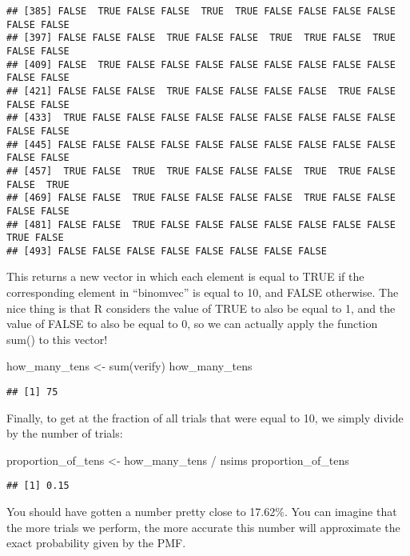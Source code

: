 \documentclass[
]{book}
\newenvironment{Shaded}{\begin{snugshade}}{\end{snugshade}}
\newcommand{\FunctionTok}[1]{\textcolor[rgb]{0.00,0.00,0.00}{#1}}
\newcommand{\NormalTok}[1]{#1}
\newcommand{\OtherTok}[1]{\textcolor[rgb]{0.56,0.35,0.01}{#1}}
\newcommand{\SpecialCharTok}[1]{\textcolor[rgb]{0.00,0.00,0.00}{#1}}
\begin{document}
\begin{verbatim}
## [385] FALSE  TRUE FALSE FALSE  TRUE  TRUE FALSE FALSE FALSE FALSE FALSE FALSE
## [397] FALSE FALSE FALSE  TRUE FALSE FALSE  TRUE  TRUE FALSE  TRUE FALSE FALSE
## [409] FALSE  TRUE FALSE FALSE FALSE FALSE FALSE FALSE FALSE FALSE FALSE FALSE
## [421] FALSE FALSE FALSE  TRUE FALSE FALSE FALSE FALSE  TRUE FALSE FALSE FALSE
## [433]  TRUE FALSE FALSE FALSE FALSE FALSE FALSE FALSE FALSE FALSE FALSE FALSE
## [445] FALSE FALSE FALSE FALSE FALSE FALSE FALSE FALSE FALSE FALSE FALSE FALSE
## [457]  TRUE FALSE  TRUE  TRUE FALSE FALSE FALSE  TRUE  TRUE FALSE FALSE  TRUE
## [469] FALSE FALSE  TRUE FALSE FALSE FALSE FALSE  TRUE FALSE FALSE FALSE FALSE
## [481] FALSE FALSE  TRUE FALSE FALSE FALSE FALSE FALSE FALSE FALSE  TRUE FALSE
## [493] FALSE FALSE FALSE FALSE FALSE FALSE FALSE FALSE
\end{verbatim}

This returns a new vector in which each element is equal to TRUE if the corresponding element in ``binomvec'' is equal to 10, and FALSE otherwise. The nice thing is that R considers the value of TRUE to also be equal to 1, and the value of FALSE to also be equal to 0, so we can actually apply the function sum() to this vector!

\begin{Shaded}
\begin{Highlighting}[]
\NormalTok{how\_many\_tens }\OtherTok{\textless{}{-}} \FunctionTok{sum}\NormalTok{(verify)}
\NormalTok{how\_many\_tens}
\end{Highlighting}
\end{Shaded}

\begin{verbatim}
## [1] 75
\end{verbatim}

Finally, to get at the fraction of all trials that were equal to 10, we simply divide by the number of trials:

\begin{Shaded}
\begin{Highlighting}[]
\NormalTok{proportion\_of\_tens }\OtherTok{\textless{}{-}}\NormalTok{ how\_many\_tens }\SpecialCharTok{/}\NormalTok{ nsims}
\NormalTok{proportion\_of\_tens}
\end{Highlighting}
\end{Shaded}

\begin{verbatim}
## [1] 0.15
\end{verbatim}

You should have gotten a number pretty close to 17.62\%. You can imagine that the more trials we perform, the more accurate this number will approximate the exact probability given by the PMF.
\end{document}
